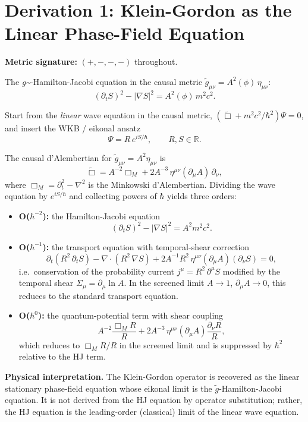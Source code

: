 \documentclass{article}
\begin{document}
\section*{Derivation 1: Klein-Gordon as the Linear Phase-Field Equation}

\textbf{Metric signature:} $(+, -, -, -)$ throughout.

The \emph{g\~{}}-Hamilton-Jacobi equation in the causal metric
$\tilde{g}_{\mu\nu} = A^2(\phi)\,\eta_{\mu\nu}$:
\[
(\partial_t S)^2 - |\nabla S|^2 = A^2(\phi)\,m^2 c^2 .
\]

Start from the \emph{linear} wave equation in the causal metric,
$(\tilde{\Box} + m^2 c^2/\hbar^2)\Psi = 0$, and insert the
WKB / eikonal ansatz
\[
\Psi = R \, e^{iS/\hbar}, \qquad R, S \in \mathbb{R} .
\]

The causal d'Alembertian for $\tilde{g}_{\mu\nu} = A^2\eta_{\mu\nu}$ is
\[
\tilde{\Box} = A^{-2}\Box_M + 2A^{-3}\,\eta^{\mu\nu}(\partial_\mu A)\,\partial_\nu ,
\]
where $\Box_M = \partial_t^2 - \nabla^2$ is the Minkowski d'Alembertian.
Dividing the wave equation by $e^{iS/\hbar}$ and collecting powers of
$\hbar$ yields three orders:

\begin{itemize}
\item \textbf{O($\hbar^{-2}$):} the Hamilton-Jacobi equation
  \[
  (\partial_t S)^2 - |\nabla S|^2 = A^2 m^2 c^2 .
  \]
\item \textbf{O($\hbar^{-1}$):} the transport equation with temporal-shear correction
  \[
  \partial_t(R^2\,\partial_t S) - \nabla\cdot(R^2\,\nabla S)
  + 2A^{-1}R^2\,\eta^{\mu\nu}(\partial_\mu A)(\partial_\nu S) = 0 ,
  \]
  i.e.~conservation of the probability current $j^\mu = R^2\,\partial^\mu S$
  modified by the temporal shear $\Sigma_\mu = \partial_\mu\ln A$.
  In the screened limit $A\to 1$, $\partial_\mu A\to 0$, this reduces to
  the standard transport equation.
\item \textbf{O($\hbar^{0}$):} the quantum-potential term with shear coupling
  \[
  A^{-2}\frac{\Box_M R}{R} + 2A^{-3}\,\eta^{\mu\nu}(\partial_\mu A)
  \frac{\partial_\nu R}{R} ,
  \]
  which reduces to $\Box_M R/R$ in the screened limit and is suppressed
  by $\hbar^2$ relative to the HJ term.
\end{itemize}

\textbf{Physical interpretation.}
The Klein-Gordon operator is recovered as the linear stationary
phase-field equation whose eikonal limit is the
$\tilde{g}$-Hamilton-Jacobi equation.  It is not derived from the HJ
equation by operator substitution; rather, the HJ equation is the
leading-order (classical) limit of the linear wave equation.
\end{document}

